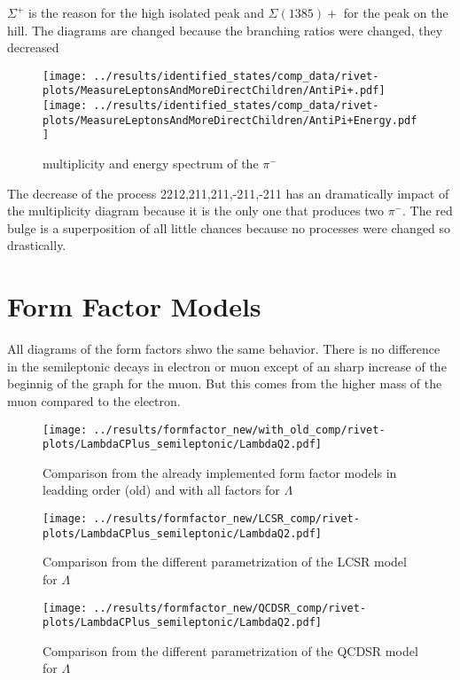 \(\Sigma^+\) is the reason for the high isolated peak and \(\Sigma(1385)+\) for 
the peak on the hill. The diagrams are changed because the branching ratios 
were changed, they decreased
\begin{figure}[h]
  \centering
  \texttt{[image: ../results/identified\_states/comp\_data/rivet-plots/MeasureLeptonsAndMoreDirectChildren/AntiPi+.pdf]}
  \texttt{[image: ../results/identified\_states/comp\_data/rivet-plots/MeasureLeptonsAndMoreDirectChildren/AntiPi+Energy.pdf]}
  \caption{multiplicity and energy spectrum of the \(\pi^-\)} \label{gr:prim-pi}
\end{figure}
The decrease of the process 2212,211,211,-211,-211 has an dramatically impact 
of the multiplicity diagram because it is the only one that produces two \(\pi^-\).
The red bulge is a superposition of all little chances because no processes were 
changed so drastically.

\clearpage
\section{Form Factor Models}
All diagrams of the form factors shwo the same behavior. There is no difference 
in the semileptonic decays in electron or muon except of an sharp increase of 
the beginnig of the graph for the muon. But this comes from the higher 
mass of the muon compared to the electron.
\begin{figure}[h]
  \centering
  \texttt{[image: ../results/formfactor\_new/with\_old\_comp/rivet-plots/LambdaCPlus\_semileptonic/LambdaQ2.pdf]}
  \caption{Comparison from the already implemented form factor models in leadding order (old)
  and with all factors for \(\Lambda\)} \label{gr:with_old_comp}
\end{figure}

\begin{figure}[h]
  \centering
  \texttt{[image: ../results/formfactor\_new/LCSR\_comp/rivet-plots/LambdaCPlus\_semileptonic/LambdaQ2.pdf]}
  \caption{Comparison from the different parametrization of the LCSR model for \(\Lambda\)} \label{gr:lcsr}
\end{figure}

\begin{figure}[h]
  \centering
  \texttt{[image: ../results/formfactor\_new/QCDSR\_comp/rivet-plots/LambdaCPlus\_semileptonic/LambdaQ2.pdf]}
  \caption{Comparison from the different parametrization of the QCDSR model for \(\Lambda\)} \label{gr:qcdsr}
\end{figure}

